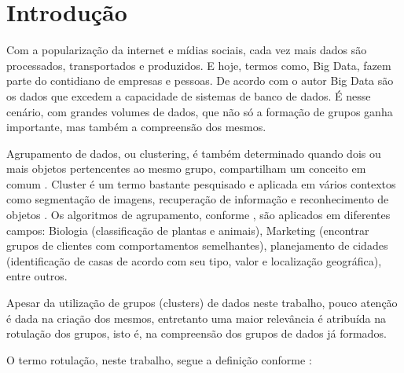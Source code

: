 
\chapter*[Introdução]{Introdução}
Com a popularização da internet e mídias sociais, cada vez mais dados são processados, transportados e produzidos. E hoje, termos como, Big Data, fazem parte do contidiano de empresas e pessoas. De acordo com o autor  Big Data são os dados que excedem a capacidade de sistemas de banco de dados. É nesse cenário, com grandes volumes de dados, que não só a formação de grupos ganha importante, mas também a compreensão dos mesmos.

Agrupamento de dados, ou clustering, é também determinado quando dois ou mais objetos pertencentes ao mesmo grupo, compartilham um conceito em comum \cite{Kumar2013}. Cluster é um termo bastante pesquisado e aplicada em vários contextos como segmentação de imagens, recuperação de informação e reconhecimento de objetos . Os algoritmos de agrupamento, conforme , são aplicados em diferentes campos: Biologia (classificação de plantas e animais), Marketing (encontrar grupos de clientes com comportamentos semelhantes), planejamento de cidades (identificação de casas de acordo com seu tipo, valor e localização geográfica), entre outros.

Apesar da utilização de grupos (clusters) de dados neste trabalho, pouco atenção é dada na criação dos mesmos, entretanto uma maior relevância é atribuída na rotulação dos grupos, isto é, na compreensão dos grupos de dados já formados. 

O termo rotulação, neste trabalho, segue a definição conforme : 

